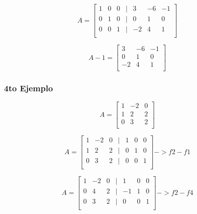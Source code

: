 \documentclass{article}
\begin{document}
\[
    A =
    \begin{bmatrix}
        1 & 0 & 0 & | & 3 & -6 & -1 \\
        0 & 1 & 0 & | & 0 & 1 & 0 \\
        0 & 0 & 1 & | & -2 & 4 & 1 \\
    \end{bmatrix}
\]

\[
    A-1 =
    \begin{bmatrix}
        3 & -6 & -1 \\
        0 & 1 & 0 \\
        -2 & 4 & 1 \\
    \end{bmatrix}
\]


\subsubsection{4to Ejemplo}


\[
    A =
    \begin{bmatrix}
        1 & -2 & 0 \\
        1 & 2 & 2 \\
        0 & 3 & 2 \\
    \end{bmatrix}
\]

\[
    A =
    \begin{bmatrix}
        1 & -2 & 0 & | & 1 & 0 & 0 \\
        1 & 2 & 2 & | & 0 & 1 & 0 \\
        0 & 3 & 2 & | & 0 & 0 & 1 \\
    \end{bmatrix}
    -> f2-f1
\]


\[
    A =
    \begin{bmatrix}
        1 & -2 & 0 & | & 1 & 0 & 0 \\
        0 & 4 & 2 & | & -1 & 1 & 0 \\
        0 & 3 & 2 & | & 0 & 0 & 1 \\
    \end{bmatrix}
    -> f2-f4
\]
\end{document}
